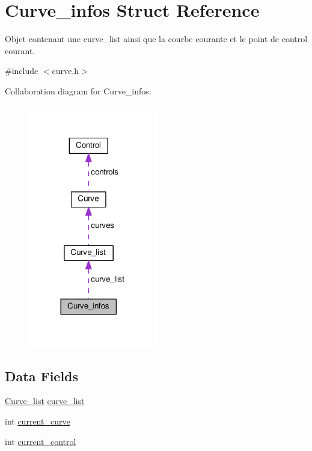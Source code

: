 \hypertarget{struct_curve__infos}{}\section{Curve\+\_\+infos Struct Reference}
\label{struct_curve__infos}


Objet contenant une curve\+\_\+list ainsi que la courbe courante et le point de control courant.  




{\ttfamily \#include $<$curve.\+h$>$}



Collaboration diagram for Curve\+\_\+infos\+:
\nopagebreak
\begin{figure}[H]
\begin{center}
\leavevmode
\includegraphics[width=161pt]{struct_curve__infos__coll__graph}
\end{center}
\end{figure}
\subsection*{Data Fields}
\begin{DoxyCompactItemize}
\item 
\hyperlink{struct_curve__list}{Curve\+\_\+list} \hyperlink{struct_curve__infos_ac27e69087504043a258d19abcaa6cc95}{curve\+\_\+list}
\item 
int \hyperlink{struct_curve__infos_a1dfb6df9eb8f617d17265d99305c8464}{current\+\_\+curve}
\item 
int \hyperlink{struct_curve__infos_ac29ff01cfeacc113317497e57f0bd892}{current\+\_\+control}
\end{DoxyCompactItemize}


